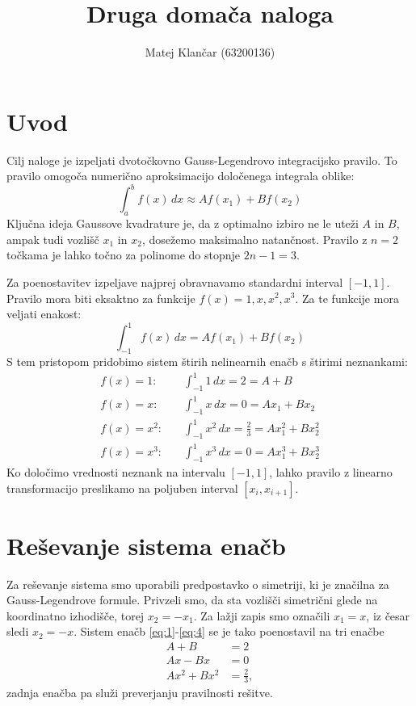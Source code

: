 \documentclass{article}
\title{Druga domača naloga}
\author{
Matej Klančar (63200136)
}
\begin{document}
\maketitle
\vspace{-1.5cm}
\section{Uvod}

Cilj naloge je izpeljati dvotočkovno Gauss-Legendrovo integracijsko pravilo. To pravilo omogoča numerično 
aproksimacijo določenega integrala oblike:
\[
\int_{a}^{b} f(x) \,dx \approx A f(x_1) + B f(x_2)
\]
Ključna ideja Gaussove kvadrature je, da z optimalno izbiro ne le uteži $A$ in $B$, ampak tudi vozlišč $x_1$ in $x_2$, 
dosežemo maksimalno natančnost. Pravilo z $n=2$ točkama je lahko točno za polinome do stopnje $2n-1=3$.

Za poenostavitev izpeljave najprej obravnavamo standardni interval $[-1, 1]$. Pravilo mora biti eksaktno za funkcije 
$f(x) = 1, x, x^2, x^3$. Za te funkcije mora veljati enakost:
\[
\int_{-1}^{1} f(x) \,dx = A f(x_1) + B f(x_2)
\]
S tem pristopom pridobimo sistem štirih nelinearnih enačb s štirimi neznankami:
\begin{align}
f(x) = 1: \quad & \int_{-1}^{1} 1 \,dx = 2 = A + B \label{eq:1} \\
f(x) = x: \quad & \int_{-1}^{1} x \,dx = 0 = A x_1 + B x_2 \label{eq:2} \\
f(x) = x^2: \quad & \int_{-1}^{1} x^2 \,dx = \frac{2}{3} = A x_1^2 + B x_2^2 \label{eq:3} \\
f(x) = x^3: \quad & \int_{-1}^{1} x^3 \,dx = 0 = A x_1^3 + B x_2^3 \label{eq:4}
\end{align}
Ko določimo vrednosti neznank na intervalu $[-1, 1]$, lahko pravilo z linearno transformacijo preslikamo
 na poljuben interval $[x_i, x_{i+1}]$.

\section{Reševanje sistema enačb}


Za reševanje sistema smo uporabili predpostavko o simetriji, ki je značilna za Gauss-Legendrove 
formule. Privzeli smo, da sta vozlišči simetrični glede na koordinatno izhodišče, torej $x_2 = -x_1$. 
Za lažji zapis smo označili $x_1 = x$, iz česar sledi $x_2 = -x$. Sistem enačb \eqref{eq:1}-\eqref{eq:4} se je tako poenostavil na tri 
enačbe
\begin{align*}
    A + B &= 2 \\
    Ax - Bx &= 0 \\
    Ax^2 + Bx^2 &= \frac{2}{3},
\end{align*}
zadnja enačba pa služi preverjanju pravilnosti rešitve.
\end{document}
